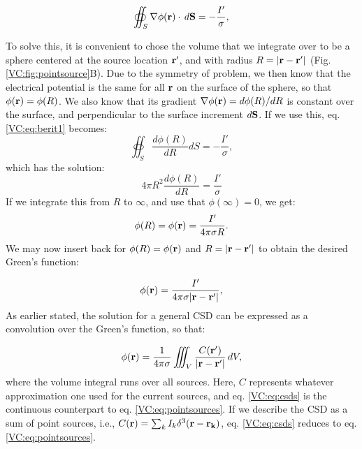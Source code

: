 \begin{equation}
\oiint_{S} \nabla\phi({\bf r}) \cdot \, d{\bf S}  = - \frac{I'}{\sigma},
\label{VC:eq:berit1}
\end{equation}

To solve this, it is convenient to chose the volume that we integrate over to be a sphere centered at the source location ${\bf r'}$, and with radius $R = |{\bf r-r'}|$ (Fig. \ref{VC:fig:pointsource}B). Due to the symmetry of problem, we then know that the electrical potential is the same for all ${\bf r}$ on the surface of the sphere, so that $\phi({\bf r}) = \phi(R)$. We also know that its gradient $\nabla\phi({\bf r}) = d\phi(R)/dR$ is constant over the surface, and perpendicular to the surface increment $d{\bf S}$. If we use this, eq. \ref{VC:eq:berit1} becomes:
\begin{equation}
\oiint_{S} \frac{d\phi(R)}{dR} d{S}  = - \frac{I'}{\sigma},
\label{VC:eq:berit1ogenhalv}
\end{equation}
which has the solution:
\begin{equation}
4\pi R^2 \frac{d\phi(R)}{dR} = \frac{I'}{\sigma}
\label{VC:eq:berit2}
\end{equation}
If we integrate this from $R$ to $\infty$, and use that $\phi(\infty) = 0$, we get:
\begin{equation}
\phi(R) = \phi({\bf r}) = \frac{I'}{4\pi \sigma R}.
\label{VC:eq:berit3}
\end{equation}
We may now insert back for $\phi(R)= \phi({\bf r})$ and $R = |{\bf r-r'}|$ to obtain the desired Green's function:

\begin{equation}
\phi({\bf r})= \frac{I'}{4\pi \sigma |{\bf r-r'}|},
\label{VC:eq:berit4}
\end{equation}
As earlier stated, the solution for a general CSD can be expressed as a convolution over the Green's function, so that:

\begin{equation}
\phi({\bf r}) = \frac{1}{4\pi \sigma}\iiint_V \frac{C({\bf r'})}{|{\bf r}-{\bf r'}|} \,dV, 
\label{VC:eq:csds}
\end{equation}
where the volume integral runs over all sources. Here, $C$ represents whatever approximation one used for the current sources, and eq. \ref{VC:eq:csds} is the continuous counterpart to eq. \ref{VC:eq:pointsources}. If we describe the CSD as a sum of point sources, i.e.,  $C({\bf r}) = \sum_k I_k \delta^3({\bf r} - {\bf r_k})$, eq. \ref{VC:eq:csds} reduces to eq.\ref{VC:eq:pointsources}.


